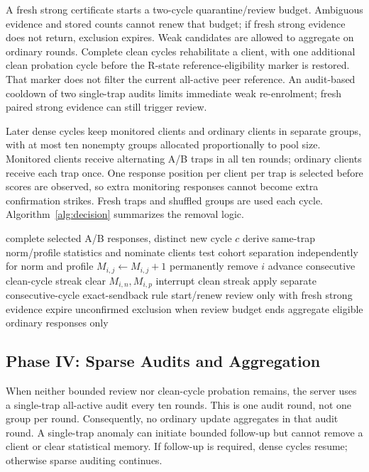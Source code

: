\documentclass[conference]{IEEEtran}
\begin{document}
A fresh strong certificate starts a two-cycle quarantine/review budget.
Ambiguous evidence and stored counts cannot renew that budget; if fresh strong
evidence does not return, exclusion expires. Weak candidates are allowed to
aggregate on ordinary rounds. Complete clean cycles rehabilitate a client,
with one additional clean probation cycle before the R-state reference-eligibility
marker is restored. That marker does not filter the current all-active peer reference.
An audit-based cooldown of two single-trap audits limits immediate weak
re-enrolment; fresh paired strong
evidence can still trigger review.

Later dense cycles keep monitored clients and ordinary clients in separate
groups, with at most ten nonempty groups allocated proportionally to pool size.
Monitored clients receive alternating A/B traps in all ten rounds; ordinary
clients receive each trap once. One response position per client per trap is
selected before scores are observed, so extra monitoring responses cannot become
extra confirmation strikes. Fresh traps and shuffled groups are used each cycle.
Algorithm~\ref{alg:decision} summarizes the removal logic.

\begin{algorithm}[t]
\caption{Full-cycle evidence and permanent-removal decision}
\label{alg:decision}
\begin{algorithmic}[1]
\Require complete selected A/B responses, distinct new cycle $c$
\State derive same-trap norm/profile statistics and nominate clients
\State test cohort separation independently for norm and profile
  \State $M_{i,j}\gets M_{i,j}+1$
   \State permanently remove $i$ \EndIf
 \EndFor
  \State advance consecutive clean-cycle streak
   \State clear $M_{i,n},M_{i,p}$ \EndIf
 \Else \State interrupt clean streak \EndIf
 \State apply separate consecutive-cycle exact-sendback rule
 \State start/renew review only with fresh strong evidence
 \State expire unconfirmed exclusion when review budget ends
\EndFor
\State aggregate eligible ordinary responses only
\end{algorithmic}
\end{algorithm}

\subsection{Phase IV: Sparse Audits and Aggregation}
When neither bounded review nor clean-cycle probation remains, the server uses
a single-trap all-active audit every ten rounds. This is one audit round, not
one group per round. Consequently, no ordinary update aggregates in that audit
round. A single-trap anomaly can initiate bounded follow-up but cannot remove
a client or clear statistical memory. If follow-up is required, dense cycles
resume; otherwise sparse auditing continues.
\end{document}

